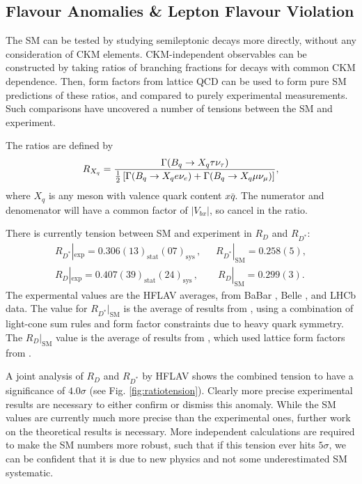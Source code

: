 \subsection{Flavour Anomalies \& Lepton Flavour Violation}

The SM can be tested by studying semileptonic decays more directly, without any consideration of CKM elements. CKM-independent observables can be constructed by taking ratios of branching fractions for decays with common CKM dependence. Then, form factors from lattice QCD can be used to form pure SM predictions of these ratios, and compared to purely experimental measurements. Such comparisons have uncovered a number of tensions between the SM and experiment.

The ratios are defined by
\begin{align}
  R_{X_q} = {\Gamma(B_q\to X_q \tau \nu_{\tau}) \over {1\over 2}\left[\Gamma(B_q\to X_q e \nu_e) + \Gamma(B_q\to X_q \mu \nu_{\mu}) \right]},
  \label{eq:Rratios}
\end{align}
where $X_q$ is any meson with valence quark content $x\bar{q}$. The numerator and denomenator will have a common factor of $|V_{bx}|$, so cancel in the ratio.

There is currently tension between SM and experiment in $R_D$ and $R_{D^*}$:
\begin{gather}
  R_{D^*}|_{\text{exp}} = 0.306(13)_{\text{stat}}(07)_{\text{sys}}\,,\quad\,\,\, R_{D^*}|_{\text{SM}} = 0.258(5),
  \\
  R_D|_{\text{exp}} = 0.407(39)_{\text{stat}}(24)_{\text{sys}}\,,\quad\quad R_D|_{\text{SM}} = 0.299(3).
\end{gather}
The expermental values are the HFLAV averages, from BaBar \cite{Lees:2012xj,Lees:2013uzd}, Belle \cite{Huschle:2015rga,Sato:2016svk,Hirose:2016wfn,Hirose:2017dxl}, and LHCb \cite{Aaij:2015yra,Aaij:2017uff,Aaij:2017deq} data. 
The value for $R_{D^*}|_{\text{SM}}$ is the average of results from \cite{Bigi:2016mdz,Bernlochner:2017jka,Jaiswal:2017rve}, using a combination of light-cone sum rules and form factor constraints due to heavy quark symmetry. The $R_{D}|_{\text{SM}}$ value is the average of results from \cite{Bernlochner:2017jka,Bigi:2017jbd,Jaiswal:2017rve}, which used lattice form factors from \cite{Na:2015kha,Lattice:2015rga}.

A joint analysis of $R_D$ and $R_{D^*}$ by HFLAV shows the combined tension to have a significance of $4.0\sigma$ (see Fig. \ref{fig:ratiotension}). Clearly more precise experimental results are necessary to either confirm or dismiss this anomaly. While the SM values are currently much more precise than the experimental ones, further work on the theoretical results is necessary. More independent calculations are required to make the SM numbers more robust, such that if this tension ever hits $5\sigma$, we can be confident that it is due to new physics and not some underestimated SM systematic.

